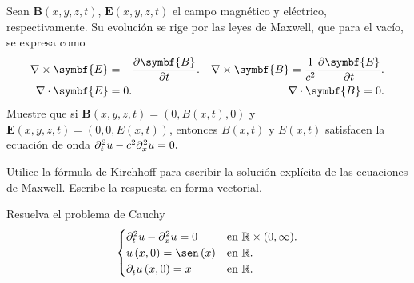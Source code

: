 Sean $\symbf{B}\left(x,y,z,t\right)$, $\symbf{E}\left(x,y,z,t\right)$
el campo magnético y eléctrico, respectivamente.
Su evolución se rige por las leyes de Maxwell, que para el vacío, se
expresa como
\begin{align*}
	\nabla\times\symbf{E}                & =
	-\diffp{\symbf{B}}{t}.
	                                     &
	\nabla\times\symbf{B}=
	\frac{1}{c^{2}}\diffp{\symbf{E}}{t}. &   \\
	\nabla\cdot\symbf{E}                 & =
	0.                                   &
	\nabla\cdot\symbf{B}=0.              &
\end{align*}
Muestre que si
\begin{math}
	\symbf{B}\left(x,y,z,t\right)=
	\left(0,B\left(x,t\right),0\right)
\end{math}
y
\begin{math}
	\symbf{E}\left(x,y,z,t\right)=
	\left(0,0,E\left(x,t\right)\right)
\end{math},
entonces $B\left(x,t\right)$ y $E\left(x,t\right)$ satisfacen la
ecuación de onda
\begin{math}
	\difcp[2]{u}{t}-c^{2}\difcp[2]{u}{x}=
	0.
\end{math}

\question

Utilice la fórmula de Kirchhoff para escribir la solución explícita
de las ecuaciones de Maxwell.
Escribe la respuesta en forma vectorial.

\question

Resuelva el problema de Cauchy
\begin{equation*}
	\begin{cases}
		\difcp[2]{u}{t}-
		\difcp[2]{u}{x}=0                    &
		\text{en }\mathbb{R}\times(0,\infty).  \\
		u\left(x,0\right)=\sen\left(x\right) &
		\text{en }\mathbb{R}.                  \\
		\difcp{u}{t}\left(x,0\right)=x       &
		\text{en }\mathbb{R}.
	\end{cases}
\end{equation*}

\question

